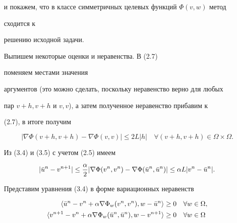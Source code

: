 и покажем, что в классе симметричных целевых функций $\Phi(v,w)$ метод


сходится к


решению исходной задачи.





Выпишем некоторые оценки и неравенства. В (2.7)


поменяем местами значения


аргументов (это можно сделать, поскольку неравенство верно для любых


пар $v+h,v+h$ и $v,v$), а затем полученное неравенство прибавим к


(2.7), в итоге получим


\begin{equation}


|\nabla\Phi(v+h,v+h)-\nabla\Phi(v,v)|\le 2L|h|\quad


\forall(v+h,v+h)\in\Omega\times\Omega.


\end{equation}


Из (3.4) и (3.5) с учетом (2.5) имеем


\begin{equation}


|\Bar u^n-v^{n+1}|\le\frac{\alpha}{2}


|\nabla\Phi(v^n,v^n)-\nabla\Phi(\Bar u^n,\Bar u^n)|\le


\alpha L|v^n-\Bar u^n|.


\end{equation}





Представим уравнения (3.4) в форме вариационных неравенств


\begin{equation}


\begin{split}


\la\Bar u^n-v^n+\alpha\nabla\Phi_w(v^n,v^n),w-\Bar u^n\ra


&\ge 0\quad \forall w\in \Omega,\\


\la v^{n+1}-v^n+\alpha\nabla\Phi_w(\Bar u^n,\Bar u^n),w-v^{n+1}\ra


&\ge 0\quad \forall w\in \Omega


\end{split}


\end{equation}


